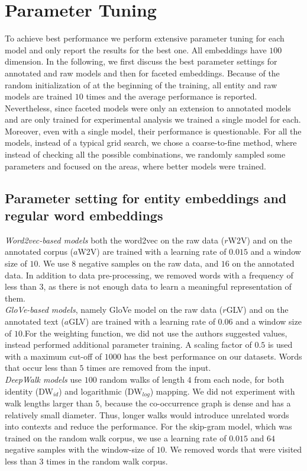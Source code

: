 \section{Parameter Tuning } \label{sec:setup}
To achieve best performance we perform extensive parameter tuning for each model and only report the results for the best one. All embeddings have $100$ dimension. In the following, we first discuss the best parameter settings for annotated and raw models and then for faceted embeddings. Because of the random initialization of at the beginning of the training, all entity and raw models are trained $10$ times and the average performance is reported. Nevertheless, since faceted models were only an extension to annotated models and are only trained for experimental analysis we trained a single model for each. Moreover, even with a single model, their performance is questionable. For all the models, instead of a typical grid search, we chose a coarse-to-fine method, where instead of checking all the possible combinations, we randomly sampled some parameters and focused on the areas, where better models were trained.
\subsection{Parameter setting for  entity embeddings and regular word embeddings  }
 
\emph{Word2vec-based models} both the word2vec on the raw data ($r$W2V) and on the annotated corpus ($a$W2V) are trained with a learning rate of $0.015$ and a window size of $10$. We use $8$ negative samples on the raw data, and $16$ on the annotated data. In addition to data pre-processing, we removed words with a frequency of less than $3$, as there is not enough data to learn a meaningful representation of them. \\

\noindent
\emph{GloVe-based models}, namely GloVe model on the raw data ($r$GLV) and on the annotated text ($a$GLV) are trained with a learning rate of $0.06$ and a window size of $10$.For the weighting function, we did not use the authors suggested values, instead performed additional parameter training. A scaling factor of $0.5$ is used with a maximum cut-off of $1000$ has the best performance on our datasets. Words that occur less than $5$ times are removed from the input.\\

\noindent
\emph{DeepWalk models} use $100$ random walks of length $4$ from each node, for both identity (DW$_{id}$) and logarithmic (DW$_{log}$) mapping. We did not experiment with walk lengths larger than $5$, because the co-occurrence graph is dense and has a relatively small diameter.  Thus, longer walks would introduce unrelated words into contexts and reduce the performance. For the skip-gram model, which was trained on the random walk corpus, we use a learning rate of $0.015$ and $64$ negative samples with the window-size of $10$. We removed words that were visited less than $3$ times in the random walk corpus. \\

